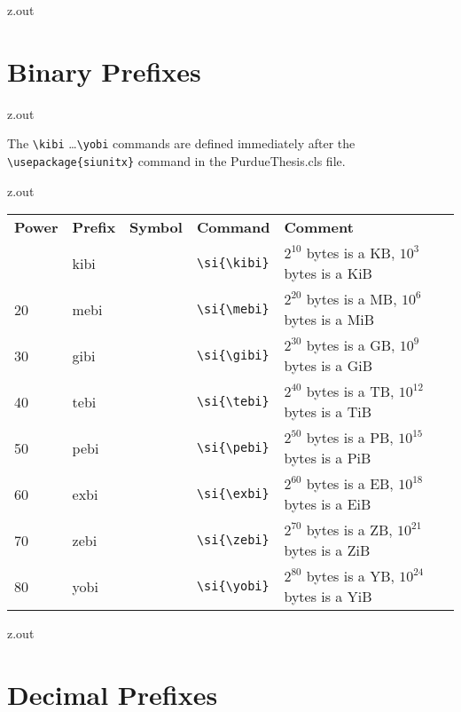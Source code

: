 \MyIO


\begin{VerbatimOut}{z.out}

\section{Binary Prefixes}
\end{VerbatimOut}

\MyIO


\begin{VerbatimOut}{z.out}

The \verb+\kibi+ \ldots \verb+\yobi+
commands are defined immediately after the \verb+\usepackage{siunitx}+ command
in the PurdueThesis.cls file.
\end{VerbatimOut}

\MyIO


\begin{VerbatimOut}{z.out}

\renewcommand{\t}[4]{\(2^{#1}\) bytes is a #2, \(10^{#3}\) bytes is a #4}
\begin{tabular}{@{}mllll@{}}
  \multicolumn{1}{l}{\bfseries Power}&
    \bfseries Prefix&
    \bfseries Symbol&
    \bfseries Command&
    \bfseries Comment\\
  \tabularspace
  10& kibi& \unit{\kibi\nounit}& \verb+\si{\kibi}+& \t{10}{KB}{3}{KiB}\\
  20& mebi& \unit{\mebi\nounit}& \verb+\si{\mebi}+& \t{20}{MB}{6}{MiB}\\
  30& gibi& \unit{\gibi\nounit}& \verb+\si{\gibi}+& \t{30}{GB}{9}{GiB}\\
  40& tebi& \unit{\tebi\nounit}& \verb+\si{\tebi}+& \t{40}{TB}{12}{TiB}\\
  50& pebi& \unit{\pebi\nounit}& \verb+\si{\pebi}+& \t{50}{PB}{15}{PiB}\\
  60& exbi& \unit{\exbi\nounit}& \verb+\si{\exbi}+& \t{60}{EB}{18}{EiB}\\
  70& zebi& \unit{\zebi\nounit}& \verb+\si{\zebi}+& \t{70}{ZB}{21}{ZiB}\\
  80& yobi& \unit{\yobi\nounit}& \verb+\si{\yobi}+& \t{80}{YB}{24}{YiB}\\
\end{tabular}
\end{VerbatimOut}

\MyIO


\begin{VerbatimOut}{z.out}

\section{Decimal Prefixes}
\end{VerbatimOut}

